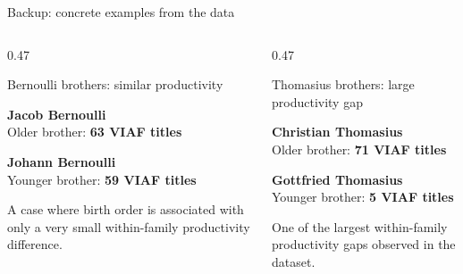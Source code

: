 \documentclass[aspectratio=169,10pt]{beamer}
\begin{document}
\begin{frame}{Backup: concrete examples from the data}

\begin{columns}[T,onlytextwidth]

\begin{column}{0.47\textwidth}

\begin{block}{Bernoulli brothers: similar productivity}
\small

\textbf{Jacob Bernoulli}\\
Older brother: \textbf{63 VIAF titles}

\vspace{0.20em}

\textbf{Johann Bernoulli}\\
Younger brother: \textbf{59 VIAF titles}

\vspace{0.25em}

{\footnotesize
A case where birth order is associated with only a very small
within-family productivity difference.
}

\end{block}

\end{column}

\begin{column}{0.47\textwidth}

\begin{alertblock}{Thomasius brothers: large productivity gap}
\small

\textbf{Christian Thomasius}\\
Older brother: \textbf{71 VIAF titles}

\vspace{0.20em}

\textbf{Gottfried Thomasius}\\
Younger brother: \textbf{5 VIAF titles}

\vspace{0.25em}

{\footnotesize
One of the largest within-family productivity gaps
observed in the dataset.
}

\end{alertblock}


\end{column}
\end{columns}
\end{frame}
\end{document}
